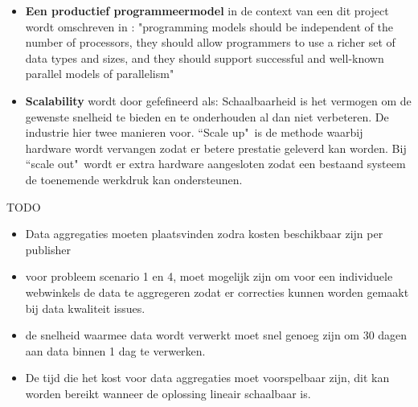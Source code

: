 \begin{itemize}
    \item \textbf{Een productief programmeermodel} in de context van een dit project wordt omschreven in \textcite{asanovic2006landscape}: "programming models should be independent of the number of processors, they should allow programmers to use a richer set of data types and sizes, and they should support successful and well-known parallel models of parallelism"

    \item \textbf{Scalability} wordt door \textcite{dubey2005recognition} gefefineerd als: Schaalbaarheid is het vermogen om de gewenste snelheid te bieden en te onderhouden al dan niet verbeteren. De industrie hier twee manieren voor. ``Scale up"\ is de methode waarbij hardware wordt vervangen zodat er betere prestatie geleverd kan worden. Bij ``scale out"\ wordt er extra hardware aangesloten zodat een bestaand systeem de toenemende werkdruk kan ondersteunen.
\end{itemize}

TODO
\begin{itemize}
    \item Data aggregaties moeten plaatsvinden zodra kosten beschikbaar zijn per publisher
    
    \item voor probleem scenario 1 en 4, moet mogelijk zijn om voor een individuele webwinkels de data te aggregeren zodat er correcties kunnen worden gemaakt bij data kwaliteit issues. 
    \item de snelheid waarmee data wordt verwerkt moet snel genoeg zijn om 30 dagen aan data binnen 1 dag te verwerken.
    
    \item De tijd die het kost voor data aggregaties moet voorspelbaar zijn, dit kan worden bereikt wanneer de oplossing lineair schaalbaar is.
\end{itemize}

